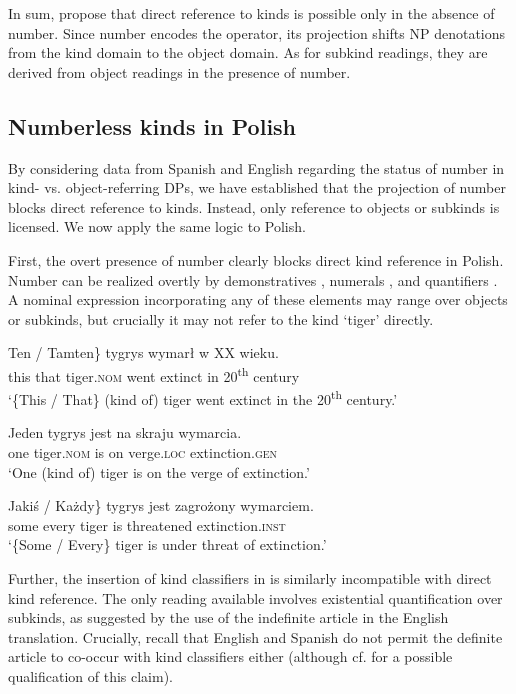 \documentclass[output=paper,
colorlinks,
citecolor=brown,
newtxmath
]{langscibook}
\begin{document}
\noindent
In sum, \citeauthor{Borik.Espinal2012} propose that direct reference to kinds is possible only in the absence of number. Since number encodes the  operator, its projection shifts NP denotations from the kind domain to the object domain. As for subkind readings, they are derived from object readings in the presence of number.


\subsection{Numberless kinds in Polish} \label{sec:numberless_kinds_pol}

By considering data from Spanish and English regarding the status of number in kind- vs. object-referring DPs, we have established that the projection of number blocks direct reference to kinds. Instead, only reference to objects or subkinds is licensed.
We now apply the same logic to Polish.

First, the overt presence of number clearly blocks direct kind reference in Polish. Number can be realized overtly by demonstratives , numerals , and quantifiers . A nominal expression incorporating any of these elements may range over objects or subkinds, but crucially it may not refer to the kind `tiger' directly.

\ea \label{ex:tiger}
\ea \gll
\minsp{\{} Ten / Tamten\} tygrys wymarł w XX wieku.\\
{} this {} that tiger.\textsc{nom} {went extinct} in 20\textsuperscript{th} century\\
\glt `\{This / That\} (kind of) tiger went extinct in the 20\textsuperscript{th} century.'
\label{ex:tiger_dem}

\ex \gll
Jeden tygrys jest na skraju wymarcia.\\
one tiger.\textsc{nom} is on verge.\textsc{loc} extinction.\textsc{gen}\\
\glt `One (kind of) tiger is on the verge of extinction.'
\label{ex:tiger_num}

\ex \gll
\minsp{\{} Jakiś / Każdy\} tygrys jest zagrożony wymarciem.\\
{} some {} every tiger is threatened extinction.\textsc{inst}\\
\glt `\{Some / Every\} tiger is under threat of extinction.'
\label{ex:tiger_quant}
\z \z

\noindent
Further, the insertion of kind classifiers in  is similarly incompatible with direct kind reference. The only reading available involves existential quantification over subkinds, as suggested by the use of the indefinite article in the English translation. Crucially, recall that English and Spanish do not permit the definite article to co-occur with kind classifiers either (although cf.  for a possible qualification of this claim).
\end{document}
